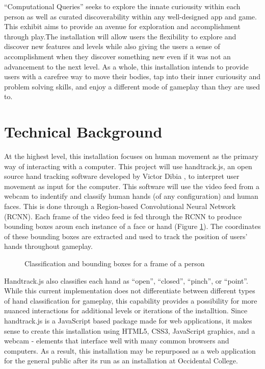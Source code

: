 \documentclass[10pt,twocolumn]{article}
\begin{document}
``Computational Queries'' seeks to explore the innate curiousity within each person as well as curated discoverability within any well-designed app and game. This exhibit aims to provide an avenue for exploration and accomplishment through play.The installation will allow users the flexibility to explore and discover new features and levels while also giving the users a sense of accomplishment when they discover something new even if it was not an advancement to the next level. As a whole, this installation intends to provide users with a carefree way to move their bodies, tap into their inner curiousity and problem solving skills, and enjoy a different mode of gameplay than they are used to. 


\section{Technical Background}
At the highest level, this installation focuses on human movement as the primary way of interacting with a computer.  This project will use handtrack.js, an open source hand tracking software developed by Victor Dibia \cite{noauthor_handtrackjs_nodate-1}, to interpret user movement as input for the computer.  This software will use the video feed from a webcam to indentify and classify human hands (of any configuration) and human faces.  This is done through a Region-based Convolutional Neural Network (RCNN). Each frame of the video feed is fed through the RCNN to produce bounding boxes aroun each instance of a face or hand (Figure \ref{fig:bounding_boxes}). The coordinates of these bounding boxes are extracted and used to track the position of users' hands throughout gameplay. 

\begin{figure}[hbh]
\begin{center}
\vspace{.5cm}
\caption{Classification and bounding boxes for a frame of a person}
\label{fig:bounding_boxes}
\end{center}
\end{figure}

Handtrack.js also classifies each hand as ``open'', ``closed'', ``pinch'', or ``point''.   While this current implementation does not differentiate between different types of hand classification for gameplay, this capability provides a possibility for more nuanced interactions for additional levels or iterations of the installtion. Since handtrack.js is a JavaScript based package made for web applications, it makes sense to create this installation using HTML5, CSS3, JavaScript graphics, and a webcam - elements that interface well with many common browsers and computers.   As a result, this installation may be repurposed as a web application for the general public after its run as an installation at Occidental College. 
\end{document}
